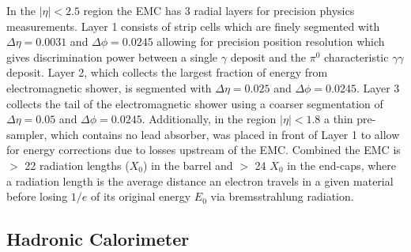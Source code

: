 In the $|\eta| < 2.5$ region the EMC has 3 radial layers for precision physics
measurements.  Layer 1 consists of strip cells which are finely segmented with
$\Delta\eta = 0.0031$ and $\Delta\phi = 0.0245$ allowing for precision position
resolution which gives discrimination power between a single $\gamma$ deposit
and the $\pi^0$ characteristic $\gamma\gamma$ deposit. Layer 2, which collects
the largest fraction of energy from electromagnetic shower, is segmented with
$\Delta\eta = 0.025$ and $\Delta\phi = 0.0245$. Layer 3 collects the tail of the
electromagnetic shower using a coarser segmentation of $\Delta\eta = 0.05$ and
$\Delta\phi = 0.0245$.  Additionally, in the region $|\eta| < 1.8$ a thin
pre-sampler, which contains no lead absorber, was placed in front of Layer 1 to
allow for energy corrections due to losses upstream of the EMC.  Combined the
EMC is $>$ 22 radiation lengths ($X_0$) in the barrel and $>$ 24 $X_0$ in the
end-caps, where a radiation length is the average distance an electron travels
in a given material before losing $1/e$ of its original energy $E_0$ via
bremsstrahlung radiation.

\subsection{Hadronic Calorimeter}

